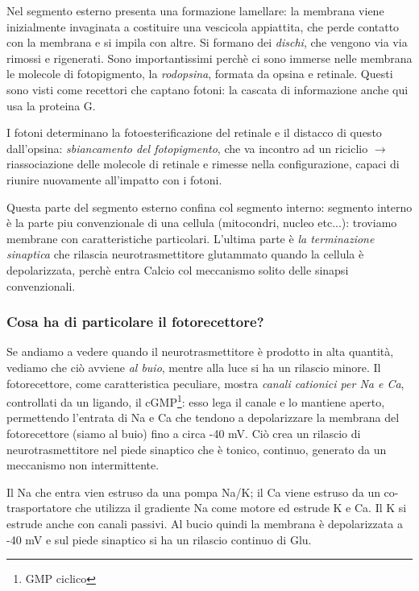 \documentclass[a4paper,12pt]{article}
\newcommand{\lfreccia}{\ensuremath{\longrightarrow}}
\begin{document}
Nel segmento esterno presenta una formazione lamellare: la membrana viene inizialmente invaginata a costituire una vescicola appiattita, che perde contatto con la membrana e si impila con altre. Si formano dei \emph{dischi}, che vengono via via rimossi e rigenerati. Sono importantissimi perchè ci sono immerse nelle membrana le molecole di fotopigmento, la \emph{rodopsina}, formata da opsina e retinale. Questi sono visti come recettori che captano fotoni: la cascata di informazione anche qui usa la proteina G. 

I fotoni determinano la fotoesterificazione del retinale e il distacco di questo dall'opsina: \emph{sbiancamento del fotopigmento}, che va incontro ad un riciclio \lfreccia riassociazione delle molecole di retinale e rimesse nella configurazione, capaci di riunire nuovamente all'impatto con i fotoni.

Questa parte del segmento esterno confina col segmento interno: segmento interno è la parte piu convenzionale di una cellula (mitocondri, nucleo etc...): troviamo membrane con caratteristiche particolari. L'ultima parte è \emph{la terminazione sinaptica} che rilascia neurotrasmettitore glutammato quando la cellula è depolarizzata, perchè entra Calcio col meccanismo solito delle sinapsi convenzionali. 

\subsubsection{Cosa ha di particolare il fotorecettore?}

Se andiamo a vedere quando il neurotrasmettitore è prodotto in alta quantità, vediamo che ciò avviene \emph{al buio}, mentre alla luce si ha un rilascio minore. Il fotorecettore, come caratteristica peculiare, mostra \emph{canali cationici per Na e Ca}, controllati da un ligando, il cGMP\footnote{GMP ciclico}: esso lega il canale e lo mantiene aperto, permettendo l'entrata di Na e Ca che tendono a depolarizzare la membrana del fotorecettore (siamo al buio) fino a circa -40 mV. Ciò crea un rilascio di neurotrasmettitore nel piede sinaptico che è tonico, continuo, generato da un meccanismo non intermittente. 

Il Na che entra vien estruso da una pompa Na/K; il Ca viene estruso da un co-trasportatore che utilizza il gradiente Na come motore ed estrude K e Ca. Il K si estrude anche con canali passivi. Al bucio quindi la membrana è depolarizzata a -40 mV e sul piede sinaptico si ha un rilascio continuo di Glu.  
\end{document}
